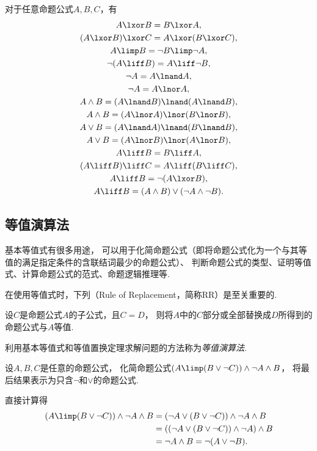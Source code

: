 \begin{theorem}
对于任意命题公式\(A,B,C\)，有\begin{gather}
	A \lxor B = B \lxor A, \\
	(A \lxor B) \lxor C = A \lxor (B \lxor C), \\
	A \limp B = \neg B \limp \neg A, \\
	\neg(A \liff B) = A \liff \neg B, \\
	\neg A = A \lnand A, \\
	\neg A = A \lnor A, \\
	A \land B = (A \lnand B) \lnand (A \lnand B), \\
	A \land B = (A \lnor A) \lnor (B \lnor B), \\
	A \lor B = (A \lnand A) \lnand (B \lnand B), \\
	A \lor B = (A \lnor B) \lnor (A \lnor B), \\
	A \liff B = B \liff A, \\
	(A \liff B) \liff C = A \liff (B \liff C), \\
	A \liff B = \neg(A \lxor B), \\
	A \liff B = (A \land B) \lor (\neg A \land \neg B).
\end{gather}
\end{theorem}

\subsection{等值演算法}
基本等值式有很多用途，
可以用于化简命题公式（即将命题公式化为一个与其等值的满足指定条件的含联结词最少的命题公式）、
判断命题公式的类型、证明等值式、计算命题公式的范式、命题逻辑推理等.

在使用等值式时，下列（Rule of Replacement，简称RR）是至关重要的.
\begin{theorem}
设\(C\)是命题公式\(A\)的子公式，且\(C = D\)，
则将\(A\)中的\(C\)部分或全部替换成\(D\)所得到的命题公式与\(A\)等值.
\end{theorem}

利用基本等值式和等值置换定理求解问题的方法称为\emph{等值演算法}.

\begin{example}
设\(A,B,C\)是任意的命题公式，
化简命题公式\((A \limp (B \lor \neg C)) \land \neg A \land B\)，
将最后结果表示为只含\(\neg\)和\(\lor\)的命题公式.
\begin{solution}
直接计算得\begin{align*}
	(A \limp (B \lor \neg C)) \land \neg A \land B
	&= (\neg A \lor (B \lor \neg C)) \land \neg A \land B \\
	&= ((\neg A \lor (B \lor \neg C)) \land \neg A) \land B \\
	&= \neg A \land B
	= \neg(A \lor \neg B).
\end{align*}
\end{solution}
\end{example}

